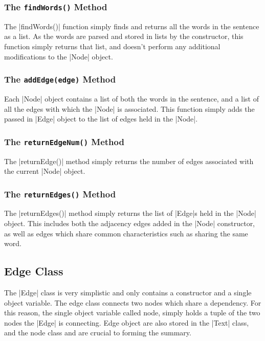 	\subsubsection{The {\tt findWords()} Method}
	The |findWords()| function simply finds and returns all the words in the sentence as a list. As the words are parsed and stored in lists by the constructor, this function simply returns that list, and doesn't perform any additional modifications to the |Node| object.
	
	\subsubsection{The {\tt addEdge(edge)} Method}	
	Each |Node| object contains a list of both the words in the sentence, and a list of all the edges with which the |Node| is associated. This function simply adds the passed in |Edge| object to the list of edges held in the |Node|.
	
	\subsubsection{The {\tt returnEdgeNum()} Method}
	The |returnEdge()| method simply returns the number of edges associated with the current |Node| object.
	
	\subsubsection{The {\tt returnEdges()} Method}
	The |returnEdges()| method simply returns the list of |Edge|s held in the |Node| object. This includes both the adjacency edges added in the |Node| constructor, as well as edges which share common characteristics such as sharing the same word.
		
\subsection{Edge Class}
	
	The |Edge| class is very simplistic and only contains a constructor and a single object variable. The edge class connects two nodes which share a dependency. For this reason, the single object variable called node, simply holds a tuple of the two nodes the |Edge| is connecting. Edge object are also stored in the |Text| class, and the node class and are crucial to forming the summary.

	

